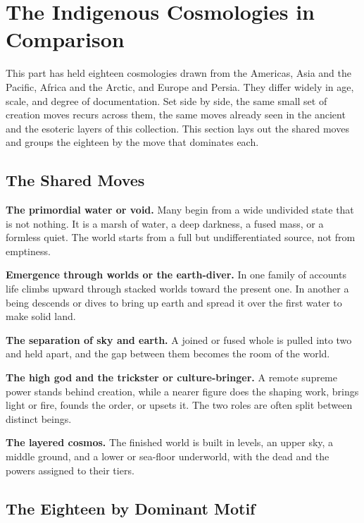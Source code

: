 \section{The Indigenous Cosmologies in Comparison}

This part has held eighteen cosmologies drawn from the Americas, Asia and the Pacific, Africa and the Arctic, and Europe and Persia. They differ widely in age, scale, and degree of documentation. Set side by side, the same small set of creation moves recurs across them, the same moves already seen in the ancient and the esoteric layers of this collection. This section lays out the shared moves and groups the eighteen by the move that dominates each.

\subsection{The Shared Moves}

\textbf{The primordial water or void.} Many begin from a wide undivided state that is not nothing. It is a marsh of water, a deep darkness, a fused mass, or a formless quiet. The world starts from a full but undifferentiated source, not from emptiness.

\textbf{Emergence through worlds or the earth-diver.} In one family of accounts life climbs upward through stacked worlds toward the present one. In another a being descends or dives to bring up earth and spread it over the first water to make solid land.

\textbf{The separation of sky and earth.} A joined or fused whole is pulled into two and held apart, and the gap between them becomes the room of the world.

\textbf{The high god and the trickster or culture-bringer.} A remote supreme power stands behind creation, while a nearer figure does the shaping work, brings light or fire, founds the order, or upsets it. The two roles are often split between distinct beings.

\textbf{The layered cosmos.} The finished world is built in levels, an upper sky, a middle ground, and a lower or sea-floor underworld, with the dead and the powers assigned to their tiers.

\subsection{The Eighteen by Dominant Motif}

